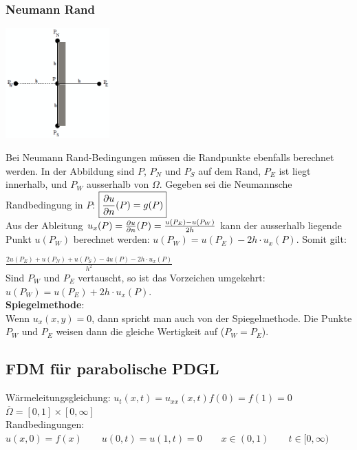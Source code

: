 \subsubsection{Neumann Rand
}
\begin{minipage}{4cm}
	\includegraphics[width=4cm]{Content/Numerik/NeumannRand.png}
\end{minipage}
\hfill
\begin{minipage}{14cm}
Bei Neumann Rand-Bedingungen müssen die Randpunkte ebenfalls berechnet werden.
In der Abbildung sind $P$, $P_N$ und $P_S$ auf dem Rand,
$P_E$ ist liegt innerhalb, und $P_W$ ausserhalb von $\Omega$.
Gegeben sei  die Neumannsche Randbedingung in $P$: $\boxed{\frac{\partial u}{\partial n}(P)=g(P)}$\\
Aus der Ableitung $u_x(P) = \frac{\partial u}{\partial n}(P) = \frac{u(P_E)-u(P_W)}{2h}$
kann der ausserhalb liegende Punkt $u(P_W)$ berechnet werden: $u(P_W)=u(P_E)-2h\cdot u_x(P)$.
Somit gilt:

$\boxed{\frac{2u(P_E) + u(P_N) +
u(P_S)- 4 u(P) - 2h\cdot u_x(P)}{h^2}}$\\

Sind $P_W$ und $P_E$ vertauscht, so ist das Vorzeichen umgekehrt:
$u(P_W)=u(P_E)+2h\cdot u_x(P)$.\\

\textbf{Spiegelmethode}:\\
Wenn $u_x(x,y) = 0$, dann spricht man auch von der Spiegelmethode. Die Punkte $P_W$ und $P_E$ weisen dann die gleiche Wertigkeit auf ($P_W=P_E$).
\end{minipage}


\subsection{FDM für parabolische PDGL}
	Wärmeleitungsgleichung: $\boxed{u_t(x,t)=u_{xx}(x,t)}$\qquad $f(0)=f(1)=0$ \qquad$ \overset{\_}{\Omega}=[0,1]\times [0,\infty]$\\

	Randbedingungen: $u(x,0)=f(x) \qquad u(0,t)=u(1,t)=0\qquad x\in(0,1) \qquad t\in[0,\infty)$

